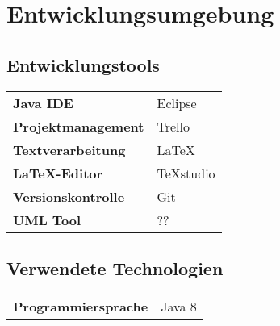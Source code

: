 \chapter{Entwicklungsumgebung}
\section{Entwicklungstools}
\begin{table}[h!]
	\begin{tabular}{l|l}
		\textbf{Java IDE} & Eclipse\\
		\textbf{Projektmanagement} & Trello\\
		\textbf{Textverarbeitung} & \LaTeX\\
		\textbf{\LaTeX-Editor} & TeXstudio\\
		\textbf{Versionskontrolle} & Git\\
		\textbf{UML Tool} & ??
	\end{tabular}
\end{table}
\section{Verwendete Technologien}
\begin{table}[h!]
	\begin{tabular}{l|l}
		\textbf{Programmiersprache} & Java 8
	\end{tabular}
\end{table}
